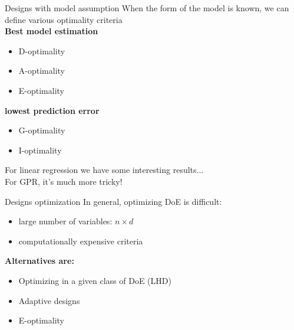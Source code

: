 \documentclass{beamer}
\begin{document}
\begin{frame}{Designs with model assumption}
When the form of the model is known, we can define various optimality criteria\\ \vspace{3mm}
\textbf{Best model estimation}
\begin{itemize}
	\item D-optimality
	\item A-optimality
	\item E-optimality
\end{itemize}
\vspace{3mm}
\textbf{lowest prediction error}
\begin{itemize}
	\item G-optimality
	\item I-optimality
\end{itemize}
\vspace{3mm}
For linear regression we have some interesting results... \\
For GPR, it's much more tricky!
\end{frame}

\begin{frame}{Designs optimization}
In general, optimizing DoE is difficult:
\begin{itemize}
	\item large number of variables: $n \times d$
	\item computationally expensive criteria
\end{itemize}
\vspace{3mm}
\textbf{Alternatives are:}
	\begin{itemize}
		\item Optimizing in a given class of DoE (LHD)
		\item Adaptive designs
		\item E-optimality
	\end{itemize}
\end{frame}


\end{document}
